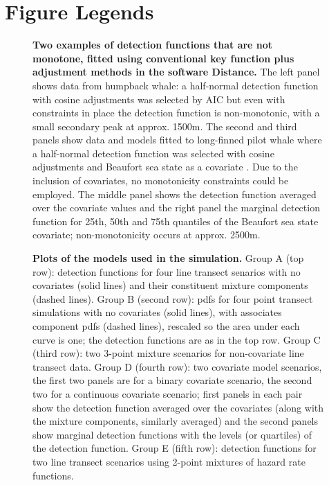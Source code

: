 \documentclass[10pt]{article}
\begin{document}
\section*{Figure Legends}

\begin{figure}[!ht]
\centering
\caption{
{\bf Two examples of detection functions that are not monotone, fitted using conventional key function plus adjustment methods in the software Distance.} The left panel shows data from humpback whale: a half-normal detection function with cosine adjustments was selected by AIC \cite{Williams:2007tc} but even with constraints in place the detection function is non-monotonic, with a small secondary peak at approx. 1500m. The second and third panels show data and models fitted to long-finned pilot whale where a half-normal detection function was selected with cosine adjustments and Beaufort sea state as a covariate \cite{Pike:2003ug}. Due to the inclusion of covariates, no monotonicity constraints could be employed.  The middle panel shows the detection function averaged over the covariate values and the right panel the marginal detection function for 25th, 50th and 75th quantiles of the Beaufort sea state covariate; non-monotonicity occurs at approx. 2500m.
}
\label{fig1}
\end{figure}


\begin{figure}[!ht]
\centering
\caption{
{\bf Plots of the models used in the simulation.} Group A (top row): detection functions for four line transect senarios with no covariates (solid lines) and their constituent mixture components (dashed lines). Group B (second row): pdfs for four point transect simulations with no covariates (solid lines), with associates component pdfs (dashed lines), rescaled so the area under each curve is one; the detection functions are as in the top row. Group C (third row): two 3-point mixture scenarios for non-covariate line transect data. Group D (fourth row): two covariate model scenarios, the first two panels are for a binary covariate scenario, the second two for a continuous covariate scenario; first panels in each pair show the detection function averaged over the covariates (along with the mixture components, similarly averaged) and the second panels show marginal detection functions with the levels (or quartiles) of the detection function.  Group E (fifth row): detection functions for two line transect scenarios using 2-point mixtures of hazard rate functions.
}
\label{sim-detfcts}
\end{figure}
\end{document}
